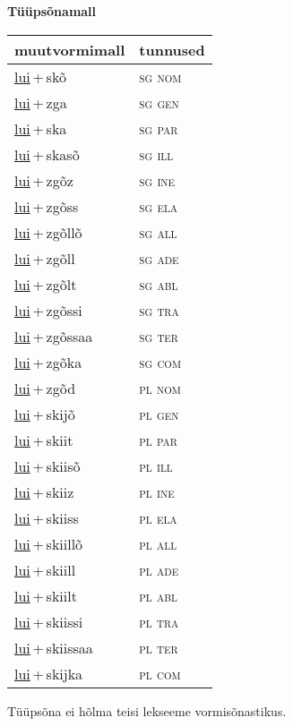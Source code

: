 
\vspace{1.8em}
\begin{minipage}{\textwidth}
\textbf{Tüüpsõnamall \,}\\

\begin{sideways}
\begin{tabular}{l l}
muutvormimall & tunnused \\
\hline
\underline{lui}\,+\,skõ & \textsc{ sg nom } \\
\underline{lui}\,+\,zga & \textsc{ sg gen } \\
\underline{lui}\,+\,ska & \textsc{ sg par } \\
\underline{lui}\,+\,skasõ & \textsc{ sg ill } \\
\underline{lui}\,+\,zgõz & \textsc{ sg ine } \\
\underline{lui}\,+\,zgõss & \textsc{ sg ela } \\
\underline{lui}\,+\,zgõllõ & \textsc{ sg all } \\
\underline{lui}\,+\,zgõll & \textsc{ sg ade } \\
\underline{lui}\,+\,zgõlt & \textsc{ sg abl } \\
\underline{lui}\,+\,zgõssi & \textsc{ sg tra } \\
\underline{lui}\,+\,zgõssaa & \textsc{ sg ter } \\
\underline{lui}\,+\,zgõka & \textsc{ sg com } \\
\underline{lui}\,+\,zgõd & \textsc{ pl nom } \\
\underline{lui}\,+\,skijõ & \textsc{ pl gen } \\
\underline{lui}\,+\,skiit & \textsc{ pl par } \\
\underline{lui}\,+\,skiisõ & \textsc{ pl ill } \\
\underline{lui}\,+\,skiiz & \textsc{ pl ine } \\
\underline{lui}\,+\,skiiss & \textsc{ pl ela } \\
\underline{lui}\,+\,skiillõ & \textsc{ pl all } \\
\underline{lui}\,+\,skiill & \textsc{ pl ade } \\
\underline{lui}\,+\,skiilt & \textsc{ pl abl } \\
\underline{lui}\,+\,skiissi & \textsc{ pl tra } \\
\underline{lui}\,+\,skiissaa & \textsc{ pl ter } \\
\underline{lui}\,+\,skijka & \textsc{ pl com } \\
\end{tabular}
\end{sideways}
\label{tab:tüüpsõnamall-luiskõ}

\end{minipage}

 
\vspace{1em}
\noindent Tüüpsõna ei hõlma teisi lekseeme vormi\-sõnastikus.
